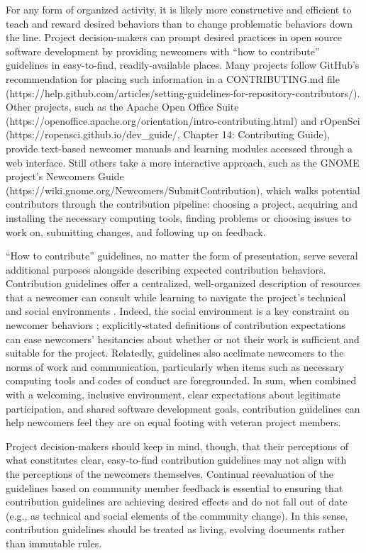 \documentclass[10pt,letterpaper]{article}
\begin{document}
For any form of organized activity,
it is likely more constructive and efficient to teach and reward desired behaviors
than to change problematic behaviors down the line.
Project decision-makers can prompt desired practices in open source software development
by providing newcomers with ``how to contribute'' guidelines in easy-to-find, readily-available places.
Many projects follow GitHub's recommendation for placing such information
in a CONTRIBUTING.md file (https://help.github.com/articles/setting-guidelines-for-repository-contributors/).
Other projects,
such as the Apache Open Office Suite (https://openoffice.apache.org/orientation/intro-contributing.html)
and rOpenSci (https://ropensci.github.io/dev\_guide/, Chapter 14: Contributing Guide),
provide text-based newcomer manuals and learning modules accessed through a web interface.
Still others take a more interactive approach,
such as the GNOME project's Newcomers Guide (https://wiki.gnome.org/Newcomers/SubmitContribution),
which walks potential contributors through the contribution pipeline:
choosing a project,
acquiring and installing the necessary computing tools,
finding problems or choosing issues to work on,
submitting changes,
and following up on feedback.

``How to contribute'' guidelines,
no matter the form of presentation,
serve several additional purposes alongside describing expected contribution behaviors.
Contribution guidelines offer a centralized, well-organized description of resources
that a newcomer can consult while learning to navigate the project's technical and social environments \cite{b:zanatta2017}.
Indeed, the social environment is a key constraint on newcomer behaviors \cite{b:steinmacher};
explicitly-stated definitions of contribution expectations can ease newcomers' hesitancies
about whether or not their work is sufficient and suitable for the project.
Relatedly,
guidelines also acclimate newcomers to the norms of work and communication,
particularly when items such as necessary computing tools and codes of conduct are foregrounded.
In sum,
when combined with a welcoming, inclusive environment,
clear expectations about legitimate participation,
and shared software development goals,
contribution guidelines can help newcomers feel they are on equal footing with veteran project members.

Project decision-makers should keep in mind,
though,
that their perceptions of what constitutes clear, easy-to-find contribution guidelines
may not align with the perceptions of the newcomers themselves.
Continual reevaluation of the guidelines based on community member feedback is essential
to ensuring that contribution guidelines are achieving desired effects
and do not fall out of date (e.g., as technical and social elements of the community change).
In this sense,
contribution guidelines should be treated as living, evolving documents rather than immutable rules.
\end{document}
